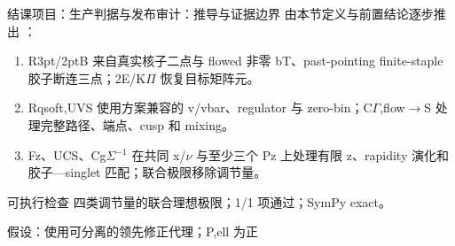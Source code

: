 \begin{frame}[t]{结课项目：生产判据与发布审计：推导与证据边界}
\footnotesize
{}\quad 由本节定义与前置结论逐步推出 ：
\begin{enumerate}
\item R3pt/\allowbreak{}2ptB 来自真实核子二点与 flowed 非零 bT、past-pointing finite-staple 胶子断连三点；2E/\allowbreak{}K\ensuremath{\Pi} 恢复目标矩阵元。
\item Rqsoft,UVS 使用方案兼容的 v/\allowbreak{}vbar、regulator 与 zero-bin；C\ensuremath{\Gamma},flow\ensuremath{\rightarrow}S 处理完整路径、端点、cusp 和 mixing。
\item Fz、UCS、Cg\ensuremath{\Sigma}\ensuremath{^{-1}} 在共同 x/\allowbreak{}\ensuremath{\nu} 与至少三个 Pz 上处理有限 z、rapidity 演化和胶子—singlet 匹配；联合极限移除调节量。
\end{enumerate}\begin{block}{可执行检查}
\quad 四类调节量的联合理想极限；1/1 项通过；SymPy exact。
\par\scriptsize 假设：使用可分离的领先修正代理；P,ell 为正
\end{block}
\end{frame}

